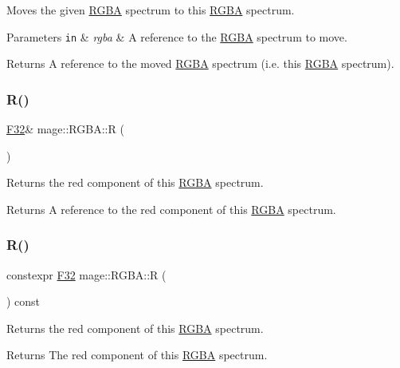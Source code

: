 Moves the given \mbox{\hyperlink{structmage_1_1_r_g_b_a}{R\+G\+BA}} spectrum to this \mbox{\hyperlink{structmage_1_1_r_g_b_a}{R\+G\+BA}} spectrum.


\begin{DoxyParams}[1]{Parameters}
\mbox{\tt in}  & {\em rgba} & A reference to the \mbox{\hyperlink{structmage_1_1_r_g_b_a}{R\+G\+BA}} spectrum to move. \\
\hline
\end{DoxyParams}
\begin{DoxyReturn}{Returns}
A reference to the moved \mbox{\hyperlink{structmage_1_1_r_g_b_a}{R\+G\+BA}} spectrum (i.\+e. this \mbox{\hyperlink{structmage_1_1_r_g_b_a}{R\+G\+BA}} spectrum). 
\end{DoxyReturn}
\mbox{\label{structmage_1_1_r_g_b_a_ad23a5ea8bb5dc80e4c4d6948f0f08a68}} 
\subsubsection{\texorpdfstring{R()}{R()}\hspace{0.1cm}{\footnotesize\ttfamily [1/2]}}
{\footnotesize\ttfamily \mbox{\hyperlink{namespacemage_aa97e833b45f06d60a0a9c4fc22ae02c0}{F32}}\& mage\+::\+R\+G\+B\+A\+::R (\begin{DoxyParamCaption}{ }\end{DoxyParamCaption})\hspace{0.3cm}{\ttfamily [noexcept]}}

Returns the red component of this \mbox{\hyperlink{structmage_1_1_r_g_b_a}{R\+G\+BA}} spectrum.

\begin{DoxyReturn}{Returns}
A reference to the red component of this \mbox{\hyperlink{structmage_1_1_r_g_b_a}{R\+G\+BA}} spectrum. 
\end{DoxyReturn}
\mbox{\label{structmage_1_1_r_g_b_a_a89b4f7119470ecbe1c4a9de1e2d65a58}} 
\subsubsection{\texorpdfstring{R()}{R()}\hspace{0.1cm}{\footnotesize\ttfamily [2/2]}}
{\footnotesize\ttfamily constexpr \mbox{\hyperlink{namespacemage_aa97e833b45f06d60a0a9c4fc22ae02c0}{F32}} mage\+::\+R\+G\+B\+A\+::R (\begin{DoxyParamCaption}{ }\end{DoxyParamCaption}) const\hspace{0.3cm}{\ttfamily [noexcept]}}

Returns the red component of this \mbox{\hyperlink{structmage_1_1_r_g_b_a}{R\+G\+BA}} spectrum.

\begin{DoxyReturn}{Returns}
The red component of this \mbox{\hyperlink{structmage_1_1_r_g_b_a}{R\+G\+BA}} spectrum. 
\end{DoxyReturn}

